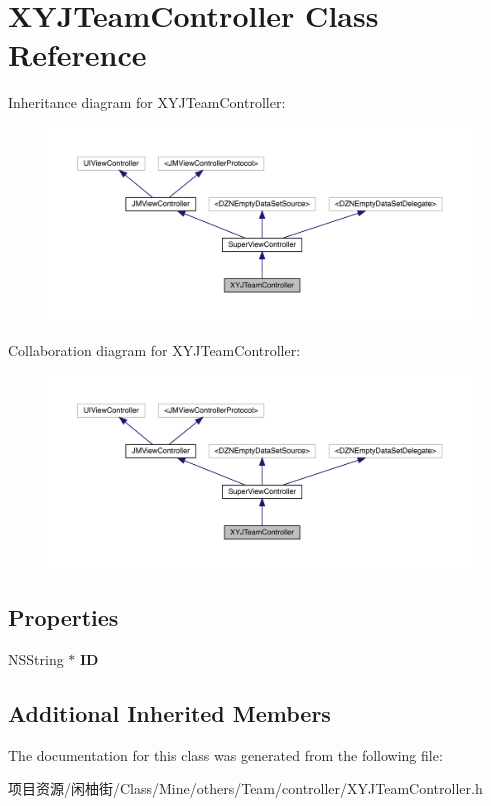 \hypertarget{interface_x_y_j_team_controller}{}\section{X\+Y\+J\+Team\+Controller Class Reference}
\label{interface_x_y_j_team_controller}


Inheritance diagram for X\+Y\+J\+Team\+Controller\+:\nopagebreak
\begin{figure}[H]
\begin{center}
\leavevmode
\includegraphics[width=350pt]{interface_x_y_j_team_controller__inherit__graph}
\end{center}
\end{figure}


Collaboration diagram for X\+Y\+J\+Team\+Controller\+:\nopagebreak
\begin{figure}[H]
\begin{center}
\leavevmode
\includegraphics[width=350pt]{interface_x_y_j_team_controller__coll__graph}
\end{center}
\end{figure}
\subsection*{Properties}
\begin{DoxyCompactItemize}
\item 
\mbox{\label{interface_x_y_j_team_controller_a6b63c8aa79db2fe521c5db50912e4e38}} 
N\+S\+String $\ast$ {\bfseries ID}
\end{DoxyCompactItemize}
\subsection*{Additional Inherited Members}


The documentation for this class was generated from the following file\+:\begin{DoxyCompactItemize}
\item 
项目资源/闲柚街/\+Class/\+Mine/others/\+Team/controller/X\+Y\+J\+Team\+Controller.\+h\end{DoxyCompactItemize}
